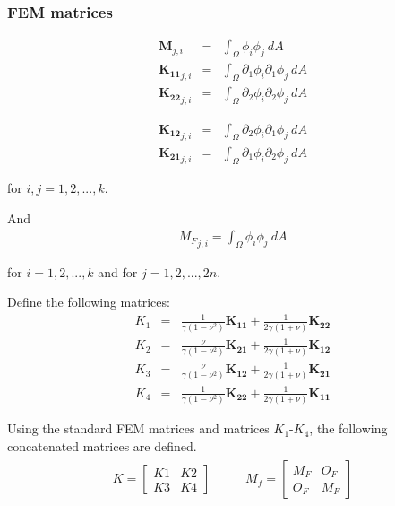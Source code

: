 \documentclass[../../main.tex]{subfiles}
\begin{document}
\subsubsection{FEM matrices}
\noindent\begin{minipage}{.5\linewidth}
	\begin{eqnarray*}
		\mathbf{M}_{j,i} & = & \int_{\Omega} \phi_i \phi_j ~dA \\
		\mathbf{{K}_{11}}_{j,i} & = & \int_{\Omega} \partial_1\phi_i \partial_1\phi_j~dA\\
		\mathbf{{K}_{22}}_{j,i} & = & \int_{\Omega} \partial_2\phi_i \partial_2\phi_j~dA
	\end{eqnarray*}
\end{minipage}%
\begin{minipage}{.5\linewidth}
	\begin{eqnarray*}
		\mathbf{{K}_{12}}_{j,i} & = & \int_{\Omega} \partial_2\phi_i \partial_1\phi_j~dA\\
		\mathbf{{K}_{21}}_{j,i} & = & \int_{\Omega} \partial_1\phi_i \partial_2\phi_j~dA
	\end{eqnarray*}
\end{minipage}
for $i,j = 1,2,...,k$.

And 
\begin{eqnarray*}
	{M_{F}}_{j,i} = \int_{\Omega}  \phi_i \phi_j~dA
\end{eqnarray*}

for $i = 1,2,...,k$ and for $j =1,2,...,2n$.

Define the following matrices:
\begin{eqnarray*}
	K_1 & = & \frac{1}{\gamma(1-\nu^2)} \mathbf{K_{11}} + \frac{1}{2\gamma(1+\nu)}\mathbf{K_{22}} \label{eq:2DFEM:K1} \\
	K_2 & = & \frac{\nu}{\gamma(1-\nu^2)} \mathbf{K_{21}} + \frac{1}{2\gamma(1+\nu)}\mathbf{K_{12}}\label{eq:2DFEM:K2}\\
	K_3 & = & \frac{\nu}{\gamma(1-\nu^2)} \mathbf{K_{12}} + \frac{1}{2\gamma(1+\nu)}\mathbf{K_{21}}\label{eq:2DFEM:K3}\\
	K_4 & = & \frac{1}{\gamma(1-\nu^2)} \mathbf{K_{22}} + \frac{1}{2\gamma(1+\nu)}\mathbf{K_{11}}\label{eq:2DFEM:K4}
\end{eqnarray*}

Using the standard FEM matrices and matrices $K_1$-$K_4$, the following concatenated matrices are defined.
\begin{eqnarray}
	\begin{aligned}
		K = 
		\begin{bmatrix}
			K1 & K2\\
			K3 & K4
		\end{bmatrix}
	\end{aligned}
	\ \ \ \ \ \ \ \ \
	\begin{aligned}
		M_f = 
		\begin{bmatrix}
			M_{F} & O_{F}\\
			O_{F} & M_{F}
		\end{bmatrix}
	\end{aligned}\label{eq:2DFEM:K+M}
\end{eqnarray}
\end{document}
